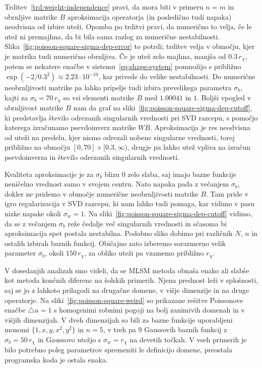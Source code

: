 \documentclass[12pt,a4paper,twoside]{article}
\theoremstyle{definition} %
\theoremstyle{plain} %
\numberwithin{equation}{section}
\newcommand{\lap}{\triangle}
\begin{document}
Trditev~\ref{trd:weight-independence} pravi, da mora biti v primeru $n=m$ in obrnljive matrike $B$
aproksimacija operatorja (in posledično tudi napaka) neodvisna od izbire uteži. Opomba po trditvi
pravi, da numerično to velja, če le utež ni premajhna, da bi bila sama razlog za numerične
nestabilnosti. Slika~\ref{fig:poisson-square-sigma-dep-error} to potrdi; trditev velja v območju,
kjer je matrika tudi numerično obrnljiva. Če je utež zelo majhna, manjša od $0.3\,r_\chi$, potem se
nekatere enačbe v sistemu~\eqref{eq:shape-system} pomnožijo s približno $\exp(-2/0.3^2) \approx
2.23\cdot10^{-10}$, kar privede do velike nestabilnosti. Do numerične neobrnljivosti matrike pa
lahko pripelje tudi izbira prevelikega parametra $\sigma_b$, kajti za $\sigma_b = 70\,r_\chi$ so vsi
elementi matrike $B$ med $1.00041$ in $1$. Boljši vpogled v obrnljivost matrike $B$ nam da graf na
sliki~\ref{fig:poisson-square-sigma-dep-cutoff}, ki predstavlja število odrezanih singularnih
vrednosti pri SVD razcepu, s pomočjo katerega izračunamo psevdoinverz matrike $WB$.
Aproksimacija je res neodvisna od uteži na predelu, kjer nismo odrezali nobene singularne vrednosti,
torej približno na območju $[0, 70] \times [0.3, \infty)$, drugje pa lahko utež vpliva na izračun
psevdoinverza in število odrezanih singularnih vrednosti.

Kvaliteta aproksimacije je za $\sigma_b$ blizu 0 zelo slaba, saj imajo bazne funkcije neničelno
vrednost samo v svojem centru. Nato napaka pada z večanjem $\sigma_b$, dokler ne pridemo v območje
numerične neobrnljivosti matrike $B$. Tam pride v igro regularizacija v SVD razcepu, ki nam lahko
tudi pomaga, kar vidimo v pasu nizke napake okoli $\sigma_w = 1$. Na
sliki~\ref{fig:poisson-square-sigma-dep-cutoff} vidimo, da se z večanjem $\sigma_b$ reže čedalje več
singularnih vrednosti in sčasoma bi aproksimacija spet postala nestabilna. Podobno sliko dobimo pri
različnih $N$, $n$ in ostalih izbirah baznih funkcij. Običajno zato izberemo sorazmerno velik
parameter $\sigma_b$, okoli $150\,r_\chi$, za obliko uteži pa vzamemo približno $r_\chi$.

V dosedanjih analizah smo videli, da se MLSM metoda obnaša enako ali slabše kot metoda končnih
diferenc na šolskih primerih. Njena prednost leži v splošnosti, saj se jo z lahkoto prilagodi na
drugačne domene, v višje dimenzije in na druge operatorje. Na sliki~\ref{fig:poisson-square-weird}
so prikazane rešitve Poissonove enačbe $\lap u = 1$ s homogenimi robnimi pogoji na bolj zanimivih
domenah in v višjih dimenzijah. V dveh dimenzijah so bili za bazne funkcije uporabljeni monomi $\{1,
x, y, x^2, y^2\}$ in $n=5$, v treh pa 9 Gaussovih baznih funkcij z $\sigma_b = 50\,r_\chi$ in
Gaussovo utežjo s $\sigma_w = r_\chi$ na devetih točkah. V vseh primerih je bilo potrebno poleg
parametrov spremeniti le definicijo domene, preostala programska koda je ostala enaka.
\end{document}

